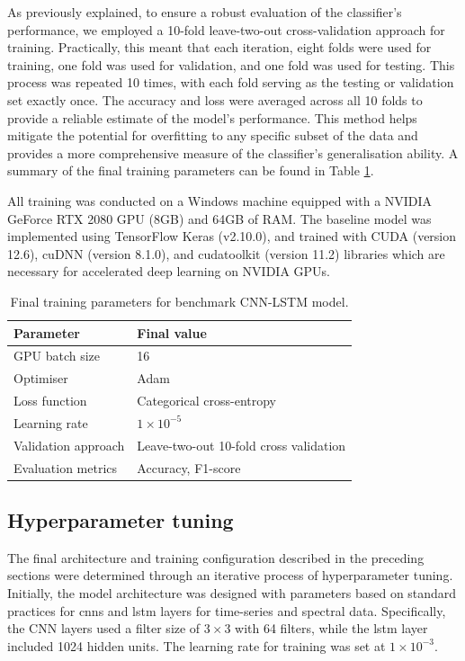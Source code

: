 As previously explained, to ensure a robust evaluation of the classifier's performance, we employed a 10-fold leave-two-out cross-validation approach for training. Practically, this meant that each iteration, eight folds were used for training, one fold was used for validation, and one fold was used for testing. This process was repeated 10 times, with each fold serving as the testing or validation set exactly once. The accuracy and loss were averaged across all 10 folds to provide a reliable estimate of the model's performance. This method helps mitigate the potential for overfitting to any specific subset of the data and provides a more comprehensive measure of the classifier's generalisation ability. A summary of the final training parameters can be found in Table \ref{tab:cnn-lstm-final-params}. 

All training was conducted on a Windows machine equipped with a NVIDIA GeForce RTX 2080 GPU (8GB) and 64GB of RAM. The baseline model was implemented using TensorFlow Keras (v2.10.0), and trained with CUDA (version 12.6), cuDNN (version 8.1.0), and cudatoolkit (version 11.2) libraries which are necessary for accelerated deep learning on NVIDIA GPUs. 

\begin{table}[htb]
    \centering
    \caption{Final training parameters for benchmark CNN-LSTM model.}
    \label{tab:cnn-lstm-final-params}
    \begin{tabular}{ll}
    \toprule
    \textbf{Parameter} & \textbf{Final value} \\ \midrule
    GPU batch size & 16 \\
    Optimiser & Adam \\
    Loss function & Categorical cross-entropy \\
    Learning rate & $1 \times 10^{-5}$ \\
    Validation approach & Leave-two-out 10-fold cross validation \\
    Evaluation metrics & Accuracy, F1-score \\ \bottomrule
    \end{tabular}
\end{table}

\subsection{Hyperparameter tuning}

The final architecture and training configuration described in the preceding sections were determined through an iterative process of hyperparameter tuning. Initially, the model architecture was designed with parameters based on standard practices for \acrshort{cnn}s and \acrshort{lstm} layers for time-series and spectral data. Specifically, the CNN layers used a filter size of $3 \times 3$ with 64 filters, while the \acrshort{lstm} layer included 1024 hidden units. The learning rate for training was set at $1 \times 10^{-3}$. 

